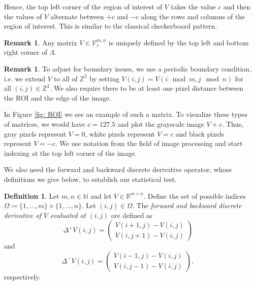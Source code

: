\documentclass[a4paper,12pt]{article}
\theoremstyle{plain}
\theoremstyle{definition}
\newtheorem{definition}[theorem]{Definition}
\newtheorem{remark}[theorem]{Remark}
\numberwithin{equation}{section}
\begin{document}
Hence, the top left corner of the region of interest of $V$ takes the value $c$ and then the values of $V$ alternate between $+c$ and $-c$ along the rows and columns of the region of interest. This is similar to the classical checkerboard pattern.

\begin{remark}
	Any matrix $V \in \mathcal{V}_c^{m, n}$ is uniquely defined by the top left and bottom right corner of $\varLambda$.
\end{remark}

\begin{remark}\label{rem: periodicboundary}
	To adjust for boundary issues, we use a periodic boundary condition, i.e. we extend $V$ to all of $\mathbb{Z}^2$ by setting $V(i, j) = V(i \mod m, j \mod n)$ for all $(i, j) \in \mathbb{Z}^2$. We also require there to be at least one pixel distance between the ROI and the edge of the image.
\end{remark}

In Figure \ref{fig: ROI} we see an example of such a matrix. To visualize these types of matrices, we would have $c = 127.5$ and plot the grayscale image $V + c$. Thus, gray pixels represent $V = 0$, white pixels represent $V = c$ and black pixels represent $V = - c$. We use notation from the field of image processing and start indexing at the top left corner of the image.

We also need the forward and backward discrete derivative operator, whose definitions we give below, to establish our statistical test.

\begin{definition}\label{def: discretederivative}
	Let $m, n \in \mathbb{N}$ and let $V \in \mathbb{R}^{m \times n}$. Define the set of possible indices $\Omega \coloneqq \{ 1, \dots, m \} \times \{ 1, \dots, n \}$. Let $(i, j) \in \Omega$. The \textit{forward and backward discrete derivative of $V$ evaluated at $(i, j)$} are defined as
	\begin{equation}
		\Delta^+ V(i, j) =
		\begin{pmatrix}
			V(i + 1, j) - V(i, j) \\
			V(i, j + 1) - V(i, j)
		\end{pmatrix}
	\end{equation}
	and
	\begin{equation}
		\Delta^- V(i, j) =
		\begin{pmatrix}
			V(i - 1, j) - V(i, j) \\
			V(i, j - 1) - V(i, j)
		\end{pmatrix}
		,
	\end{equation}
	respectively.
\end{definition}
\end{document}
